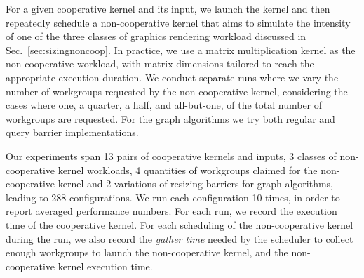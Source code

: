 \documentclass[parskip=half,sigconf,review, anonymous=true, acmcopyrightmode=none]{acmart}
\newcommand{\mysec}{Sec.~}
\begin{document}
 For a given cooperative kernel and
its input, we launch the kernel and then repeatedly schedule a
non-cooperative kernel that aims to simulate the intensity of one of
the three classes of graphics rendering workload discussed in
\mysec\ref{sec:sizingnoncoop}. In practice, we use a matrix
multiplication kernel as the non-cooperative workload, with matrix
dimensions tailored to reach the appropriate execution duration.  We
conduct separate runs where we vary the number of workgroups requested
by the non-cooperative kernel, considering the cases where one, a
quarter, a half, and all-but-one, of the total number of workgroups
are requested. For the graph algorithms we try both
regular and query barrier implementations.

Our experiments span 13 pairs of cooperative kernels and inputs, 3
classes of non-cooperative kernel workloads, 4 quantities of
workgroups claimed for the non-cooperative kernel and 2 variations of
resizing barriers for graph algorithms, leading to 288 configurations.
We run each configuration 10 times, in order to report averaged
performance numbers. For each run, we record the execution time of the
cooperative kernel. For each scheduling of the non-cooperative kernel
during the run, we also record the \emph{gather time} needed by the
scheduler to collect enough workgroups to launch the non-cooperative
kernel, and the non-cooperative kernel execution time.
%


\end{document}
